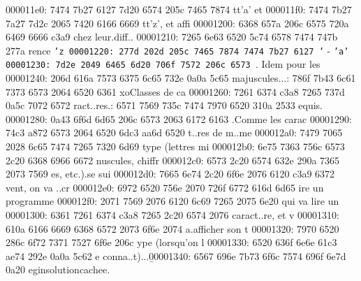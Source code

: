 \begin{soluti
00000210: 6f6e 7d0a 2020 5c62 6567 696e 7b6c 7374  on}
\begin{lst
00000220: 6c69 7374 696e 677d 5b6c 616e 6775 6167  listing}[languag
00000230: 653d 6261 7368 5d0a 2020 2020 6769 7420  e=bash]
\begin{lst
00000330: 6c69 7374 696e 677d 5b6c 616e 6775 6167  listing}[languag
00000340: 653d 435d 0a23 696e 636c 7564 6520 3c73  e=C]
\begin{cente
000003e0: 727d 0a20 205c 736c 204f 6e20 7661 206d  r}
\begin{solu
00000490: 7469 6f6e 7d0a 2020 5c62 6567 696e 7b6c  tion}
\begin{l
000004a0: 7374 6c69 7374 696e 677d 5b6c 616e 6775  stlisting}[langu
000004b0: 6167 653d 6261 7368 5d0a 2020 2020 6364  age=bash]
\begin{so
00000540: 6c75 7469 6f6e 7d0a 2020 5c62 6567 696e  lution}
\begin{solutioncachee}
\begin{lstlis
00000630: 7469 6e67 7d5b 6c61 6e67 7561 6765 3d62  ting}[language=b
00000640: 6173 685d 0a20 2020 202e 2f65 7865 7263  ash]
\begin{center}
\begin{ce
00000880: 6e74 6572 7d0a 2020 5c66 626f 787b 7e5c  nter}
\begin{ite
00000c80: 6d69 7a65 7d0a 5c69 7465 6d20 5c74 6578  mize}
000011e0: 7474 7b27 6127 7d20 6574 205c 7465 7874  tt{'a'} et \text
000011f0: 7474 7b27 7a27 7d2c 2065 7420 6166 6669  tt{'z'}, et affi
00001200: 6368 657a 206c 6575 720a 6469 6666 c3a9  chez leur.diff..
00001210: 7265 6e63 6520 5c74 6578 7474 747b 277a  rence \texttt{'z
00001220: 277d 202d 205c 7465 7874 7474 7b27 6127  '} - \texttt{'a'
00001230: 7d2e 2049 6465 6d20 706f 7572 206c 6573  }. Idem pour les
00001240: 206d 616a 7573 6375 6c65 732e 0a0a 5c65   majuscules...: 786f 7b43 6c61 7373 6573 2064 6520 6361  xo{Classes de ca
00001260: 7261 6374 c3a8 7265 737d 0a5c 7072 6572  ract..res}.: 6571 7569 735c 7474 7970 6520 310a 2533  equis.%
00001280: 0a43 6f6d 6d65 206c 6573 2063 6172 6163  .Comme les carac
00001290: 74c3 a872 6573 2064 6520 6dc3 aa6d 6520  t..res de m..me 
000012a0: 7479 7065 2028 6c65 7474 7265 7320 6d69  type (lettres mi
000012b0: 6e75 7363 756c 6573 2c20 6368 6966 6672  nuscules, chiffr
000012c0: 6573 2c20 6574 632e 290a 7365 2073 7569  es, etc.).se sui
000012d0: 7665 6e74 2c20 6f6e 2076 6120 c3a9 6372  vent, on va ..cr
000012e0: 6972 6520 756e 2070 726f 6772 616d 6d65  ire un programme
000012f0: 2071 7569 2076 6120 6c69 7265 2075 6e20   qui va lire un 
00001300: 6361 7261 6374 c3a8 7265 2c20 6574 2076  caract..re, et v
00001310: 610a 6166 6669 6368 6572 2073 6f6e 2074  a.afficher son t
00001320: 7970 6520 286c 6f72 7371 7527 6f6e 206c  ype (lorsqu'on l
00001330: 6520 636f 6e6e 61c3 ae74 292e 0a0a 5c62  e conna..t)...\b
00001340: 6567 696e 7b73 6f6c 7574 696f 6e7d 0a20  egin{solutioncachee}. 

\end{ite
00000c80: 6d69 7a65 7d0a 5c69 7465 6d20 5c74 6578  mize}
\end{ce
00000880: 6e74 6572 7d0a 2020 5c66 626f 787b 7e5c  nter}
\end{center}
\end{lstlis
00000630: 7469 6e67 7d5b 6c61 6e67 7561 6765 3d62  ting}
\end{solutioncachee}
\end{so
00000540: 6c75 7469 6f6e 7d0a 2020 5c62 6567 696e  lution}
\end{l
000004a0: 7374 6c69 7374 696e 677d 5b6c 616e 6775  stlisting}
\end{solu
00000490: 7469 6f6e 7d0a 2020 5c62 6567 696e 7b6c  tion}
\end{cente
000003e0: 727d 0a20 205c 736c 204f 6e20 7661 206d  r}
\end{lst
00000330: 6c69 7374 696e 677d 5b6c 616e 6775 6167  listing}
\end{lst
00000220: 6c69 7374 696e 677d 5b6c 616e 6775 6167  listing}
\end{soluti
00000210: 6f6e 7d0a 2020 5c62 6567 696e 7b6c 7374  on}
